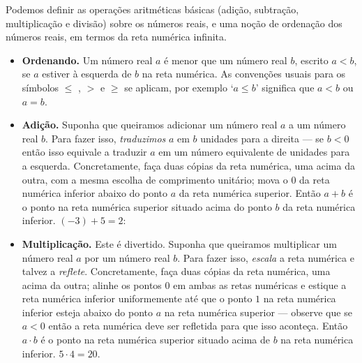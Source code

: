 Podemos definir as operações aritméticas básicas (adição, subtração, multiplicação e divisão) sobre os números reais, e uma noção de ordenação dos números reais, em termos da reta numérica infinita.
\begin{itemize}
\item \textbf{Ordenando.} Um número real $a$ é menor que um número real $b$, escrito $a<b$, se $a$ estiver à esquerda de $b$ na reta numérica. As convenções usuais para os símbolos $\le$ , $>$ e $\ge$  se aplicam, por exemplo `$a \le b$' significa que $a < b$ ou $a = b$.

\item \textbf{Adição.} Suponha que queiramos adicionar um número real $a$ a um número real $b$. Para fazer isso, \textit{traduzimos} $a$ em $b$ unidades para a direita --- se $b<0$ então isso equivale a traduzir $a$ em um número equivalente de unidades para a esquerda. Concretamente, faça duas cópias da reta numérica, uma acima da outra, com a mesma escolha de comprimento unitário; mova o $0$ da reta numérica inferior abaixo do ponto $a$ da reta numérica superior. Então $a+b$ é o ponto na reta numérica superior situado acima do ponto $b$ da reta numérica inferior.
 $(-3) + 5 = 2$:

\begin{center}
\end{center}

\item \textbf{Multiplicação.} Este é divertido. Suponha que queiramos multiplicar um número real $a$ por um número real $b$. Para fazer isso, \textit{escala} a reta numérica e talvez a \textit{reflete}. Concretamente, faça duas cópias da reta numérica, uma acima da outra; alinhe os pontos $0$ em ambas as retas numéricas e estique a reta numérica inferior uniformemente até que o ponto $1$ na reta numérica inferior esteja abaixo do ponto $a$ na reta numérica superior --- observe que se $a<0$ então a reta numérica deve ser refletida para que isso aconteça. Então $a \cdot b$ é o ponto na reta numérica superior situado acima de $b$ na reta numérica inferior.
 $5 \cdot 4 = 20$.


\end{itemize}
